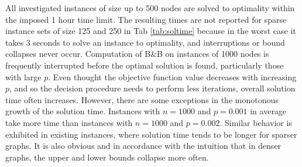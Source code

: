 All investigated instances of size up to 500 nodes are solved to optimality within the imposed 1 hour time limit.
The resulting times are not reported for sparse instance sets of size 125 and 250 in Tab \ref{tab:soltime} because in the worst case it takes 3 seconds to solve an instance to optimality,
and interruptions or bound collapses never occur.
Computation of B\&B on instances of 1000 nodes is frequently interrupted before the optimal solution is found, particularly those with large $p$.
Even thought the objective function value decreases with increasing $p$, and so the decision procedure needs to perform less iterations, overall solution time often increases.
However, there are some exceptions in the monotonous growth of the solution time.
Instances with $n=1000$ and $p=0.001$ in average take more time than instances with $n=1000$ and $p=0.002$.
Similar behavior is exhibited in existing instances, where solution time tends to be longer for sparser graphs.
It is also obvious and in accordance with the intuition that in denser graphs, the upper and lower bounds collapse more often.

